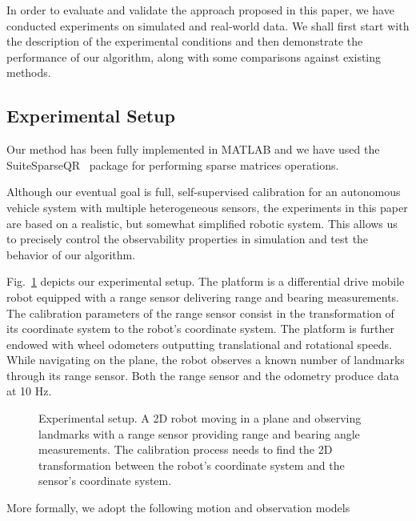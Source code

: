 In order to evaluate and validate the approach proposed in this paper, we have
conducted experiments on simulated and real-world data. We shall first start
with the description of the experimental conditions and then demonstrate the
performance of our algorithm, along with some comparisons against existing
methods.

\subsection{Experimental Setup}

Our method has been fully implemented in MATLAB and we have used the
SuiteSparseQR~\cite{davis11algorithm} package for performing sparse matrices
operations.

Although our eventual goal is full, self-supervised calibration for an
autonomous vehicle system with multiple heterogeneous sensors, the
experiments in this paper are based on a realistic, but somewhat
simplified robotic system. This allows us to precisely control the
observability properties in simulation and test the behavior of our
algorithm.

Fig.~\ref{fig:exp_setup} depicts our experimental setup. The platform
is a differential drive mobile robot equipped with a range sensor
delivering range and bearing measurements. The calibration parameters
of the range sensor consist in the transformation of its coordinate
system to the robot's coordinate system. The platform is further
endowed with wheel odometers outputting translational and rotational
speeds. While navigating on the plane, the robot observes a known
number of landmarks through its range sensor. Both the range sensor 
and the odometry produce data at 10 Hz.

\begin{figure}[t]
\centering
\begin{tikzpicture}[scale = 1.2]
  
\end{tikzpicture}
\caption{Experimental setup. A 2D robot moving in a plane and observing
  landmarks with a range sensor providing range and bearing angle measurements.
  The calibration process needs to find the 2D transformation between the
  robot's coordinate system and the sensor's coordinate system.}
\label{fig:exp_setup}
\end{figure}

More formally, we adopt the following motion and observation models

